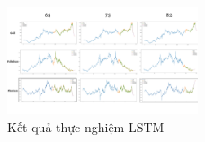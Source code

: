 \begin{figure}[htbp]
\centerline{\includegraphics[width=0.5\textwidth]{img/lstm_run.jpg}}
\caption{Kết quả thực nghiệm LSTM}
\label{fig}
\end{figure}